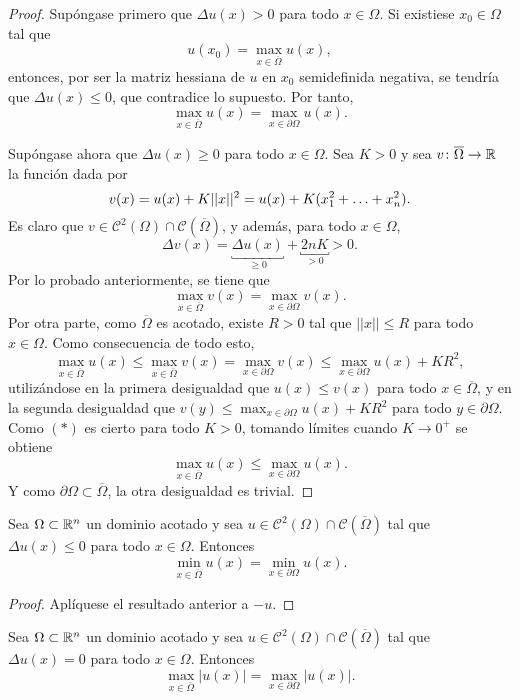 \documentclass[a4paper, 12pt, extrafontsizes]{memoir}
\begin{document}
\begin{proof}
    Supóngase primero que $\Delta u(x) > 0$ para todo $x \in \Omega$. Si existiese $x_0 \in \Omega$ tal que
    \[u(x_0) = \max_{x \in \overline{\Omega}}u(x),\]
    entonces, por ser la matriz hessiana de $u$ en $x_0$ semidefinida negativa, se tendría que $\Delta u(x) \leq 0$, que contradice lo supuesto. Por tanto,
    \[\max_{x \in \overline{\Omega}} u(x) = \max_{x \in \partial\Omega} u(x).\]

    Supóngase ahora que $\Delta u(x) \geq 0$ para todo $x \in \Omega$. Sea $K >0$ y sea $v \colon \overline{\Omega} \to \mathbb R$ la función dada por
    \[v(x) = u(x) + K||x||^2 = u(x) + K(x_1^2+\mathellipsis+x_n^2).\]
    Es claro que $v \in \mathcal{C}^2(\Omega) \cap \mathcal{C}(\overline{\Omega})$, y además, para todo $x \in \Omega$,
    \[\Delta v(x) = \underbracket{\Delta u(x)}_{\geq 0} + \underbracket{2nK}_{>0} >0.\]
    Por lo probado anteriormente, se tiene que
    \[\max_{x \in \overline{\Omega}} v(x) = \max_{x \in \partial \Omega} v(x).\]
    Por otra parte, como $\overline{\Omega}$ es acotado, existe $R>0$ tal que $||x|| \leq R$ para todo $x \in \Omega$. Como consecuencia de todo esto,
    \[\max_{x \in \overline{\Omega}} u(x) \leq \max_{x \in \overline{\Omega}} v(x) = \max_{x \in \partial \Omega} v(x) \leq \max_{x \in \partial \Omega} u(x) + KR^2, \tag{$\ast$}\]
    utilizándose en la primera desigualdad que $u(x) \leq v(x)$ para todo $x \in \overline{\Omega}$, y en la segunda desigualdad que $v(y) \leq \max_{x \in \partial \Omega} u(x)+KR^2$ para todo $y \in \partial\Omega$. Como $(\ast)$ es cierto para todo $K > 0$, tomando límites cuando $K \to 0^+$ se obtiene
    \[\max_{x \in \overline{\Omega}}u(x) \leq \max_{x \in \partial\Omega} u(x).\]
    Y como $\partial\Omega \subset \overline{\Omega}$, la otra desigualdad es trivial.
\end{proof}


\begin{corollary}
    Sea $\Omega \subset \mathbb R^n$ un dominio acotado y sea $u \in \mathcal{C}^2(\Omega) \cap \mathcal{C}(\overline{\Omega})$ tal que $\Delta u(x) \leq 0$ para todo $x \in \Omega$. Entonces
    \[\min_{x \in \overline{\Omega}} u(x) = \min_{x \in \partial \Omega} u(x).\]
\end{corollary}

\begin{proof}
    Aplíquese el resultado anterior a $-u$.
\end{proof}

\begin{corollary}
    Sea $\Omega \subset \mathbb R^n$ un dominio acotado y sea $u \in \mathcal{C}^2(\Omega) \cap \mathcal{C}(\overline{\Omega})$ tal que $\Delta u(x) = 0$ para todo $x \in \Omega$. Entonces
    \[\max_{x \in \overline{\Omega}} |u(x)| = \max_{x \in \partial \Omega} |u(x)|.\]
\end{corollary}
\end{document}
